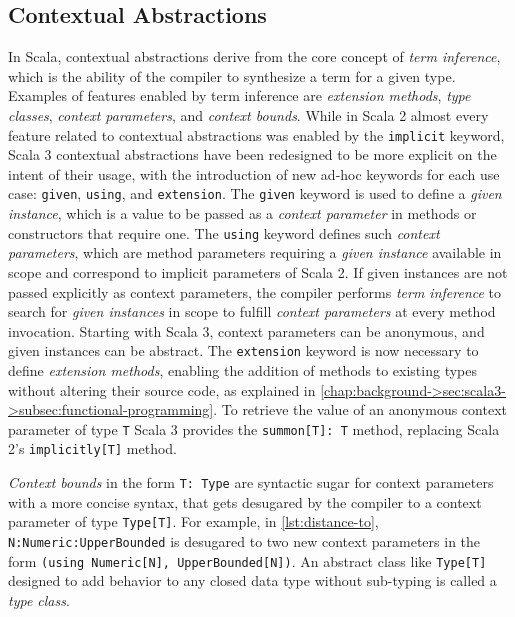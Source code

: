 \subsection{Contextual Abstractions} \label{chap:background->sec:scala3->subsec:contextual-abstractions}

In Scala, contextual abstractions derive from the core concept of \textit{term inference}, which is the ability of the compiler to synthesize a  term for a given type.
%
Examples of features enabled by term inference are \textit{extension methods}, \textit{type classes}, \textit{context parameters}, and \textit{context bounds}.
%
While in Scala 2 almost every feature related to contextual abstractions was enabled by the \texttt{implicit} keyword, Scala 3 contextual abstractions have been redesigned to be more explicit on the intent of their usage, with the introduction of new ad-hoc keywords for each use case: \texttt{given}, \texttt{using}, and \texttt{extension}.
%
The \texttt{given} keyword is used to define a \textit{given instance}, which is a value to be passed as a \textit{context parameter} in methods or constructors that require one.
%
The \texttt{using} keyword defines such \textit{context parameters}, which are method parameters requiring a \textit{given instance} available in scope and correspond to implicit parameters of Scala 2.
%
If given instances are not passed explicitly as context parameters, the compiler performs \textit{term inference} to search for \textit{given instances} in scope to fulfill \textit{context parameters} at every method invocation.
%
Starting with Scala 3, context parameters can be anonymous, and given instances can be abstract.
%
The \texttt{extension} keyword is now necessary to define \textit{extension methods}, enabling the addition of methods to existing types without altering their source code, as explained in \cref{chap:background->sec:scala3->subsec:functional-programming}.
%
To retrieve the value of an anonymous context parameter of type \texttt{T} Scala 3 provides the \texttt{summon[T]: T} method, replacing Scala 2's \texttt{implicitly[T]} method.

\textit{Context bounds} in the form \texttt{T: Type} are syntactic sugar for context parameters with a more concise syntax, that gets desugared by the compiler to a context parameter of type \texttt{Type[T]}.
%
For example, in \cref{lst:distance-to}, \texttt{N:Numeric:UpperBounded} is desugared to two new context parameters in the form \texttt{(using Numeric[N], UpperBounded[N])}.
%
An abstract class like \texttt{Type[T]} designed to add behavior to any closed data type without sub-typing is called a \textit{type class}.

